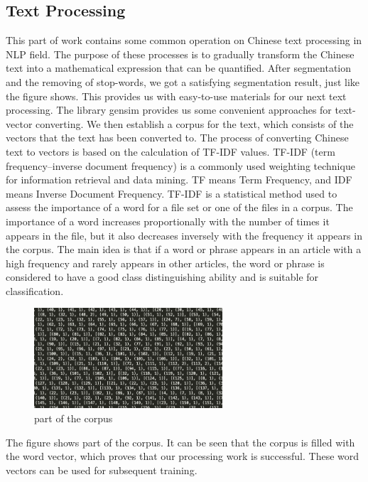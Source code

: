 \documentclass{acmtog} %
\begin{document}
\subsection{Text Processing}
\label{subsec:EquilibriumCase}
This part of work contains some common operation on Chinese text processing in NLP field. The purpose of these processes is to gradually transform the Chinese text into a mathematical expression that can be quantified.
After segmentation and the removing of stop-words, we got a satisfying segmentation result, just like the figure shows. This provides us with easy-to-use materials for our next text processing. The library gensim provides us some convenient approaches for text-vector converting. We then establish a corpus for the text, which consists of the vectors that the text has been converted to. The process of converting Chinese text to vectors is based on the calculation of TF-IDF values. TF-IDF (term frequency–inverse document frequency) is a commonly used weighting technique for information retrieval and data mining. TF means Term Frequency, and IDF means Inverse Document Frequency. TF-IDF is a statistical method used to assess the importance of a word for a file set or one of the files in a corpus. The importance of a word increases proportionally with the number of times it appears in the file, but it also decreases inversely with the frequency it appears in the corpus. The main idea is that if a word or phrase appears in an article with a high frequency and rarely appears in other articles, the word or phrase is considered to have a good class distinguishing ability and is suitable for classification.

\begin{figure}[h]
\centerline{\includegraphics[width=7cm]{Figure 3.png}}
\caption{part of the corpus}
  \label{fig:videocomparison}
\end{figure}

The figure shows part of the corpus. It can be seen that the corpus is filled with the word vector, which proves that our processing work is successful. These word vectors can be used for subsequent training.
\end{document}
